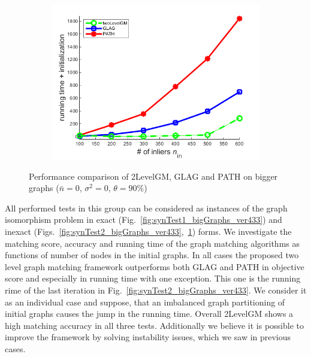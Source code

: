\begin{figure}[h]
\begin{subfigure}[b]{0.32\textwidth}
			\includegraphics[scale=0.25]{"chapter3/fig/SyntheticTest_BigGraphs/descr/Results_v4.3.3/Test3/time_summary_avg1t"} 
		\end{subfigure} 	
	\caption[Performance comparison of 2LevelGM, GLAG and PATH on bigger graphs: test $3$]{Performance comparison of 2LevelGM, GLAG and PATH on bigger graphs ($\bar{n}=0$, $\sigma^2=0$, $\theta=90\%$)}
	\label{fig:synTest3_bigGraphs_ver433}
\end{figure}

All performed tests in this group can be considered as instances of the graph isomorphism problem in exact (Fig.~\ref{fig:synTest1_bigGraphs_ver433}) and inexact (Figs.~\ref{fig:synTest2_bigGraphs_ver433},~\ref{fig:synTest3_bigGraphs_ver433}) forms. We investigate the matching score, accuracy and running time of the graph matching algorithms as functions of number of nodes in the initial graphs.
In all cases the proposed two level graph matching framework outperforms both GLAG and PATH in objective score and especially in running time with one exception. This one is the running rime of the last iteration in Fig.~\ref{fig:synTest2_bigGraphs_ver433}. We consider it as an individual case and suppose, that an imbalanced graph partitioning of initial graphs causes the jump in the running time. Overall 2LevelGM shows a high matching accuracy in all three tests. Additionally we believe it is possible to improve the framework by solving instability issues, which we saw in previous cases. 
\FloatBarrier
